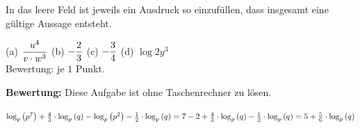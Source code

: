\documentclass[11pt]{exam}
\begin{document}
\begin{questions}
\question[4]
In das leere Feld ist jeweils ein Ausdruck so einzufüllen, dass insgesamt eine gültige Aussage entsteht.\\[-10pt]
{\begin{solution}
		(a) $\displaystyle\frac{u^4}{v\cdot w^3}$ \qquad (b) $\displaystyle-\frac{2}{3}$ \qquad (c) $\displaystyle-\frac{3}{4}$ \qquad (d) $\log{2}{y^3}$\\
		Bewertung: je $1$ Punkt.
\end{solution}}
{\vfill}

\newpage
\noaddpoints
\question[\totalpoints]
\addpoints
{\bf Bewertung:} Diese Aufgabe ist ohne Taschenrechner zu lösen.
{\begin{solution}
	$\log{p}{p^7}+\frac{4}{3}\*\log{p}{q}-\log{p}{p^2}-\frac{1}{2}\*\log{p}{q}=7-2+\frac{4}{3}\*\log{p}{q}-\frac{1}{2}\*\log{p}{q}=5+\frac{5}{6}\*\log{p}{q}$
\end{solution}}
{\vfill}
\begin{parts}
	\setcounter{partno}{1}\vspace{5pt}

\end{parts}
\end{questions}
\end{document}
